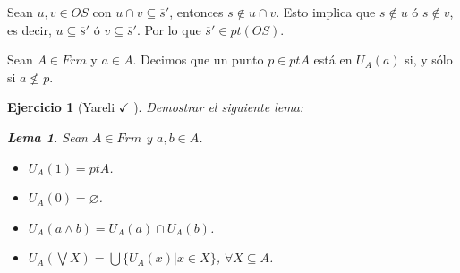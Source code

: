 \documentclass[12pt,letterpaper,titlepage]{article}
\let\emptyset\varnothing
\newtheorem{exe}{Ejercicio}
\newtheorem*{lemma}{Lema}
\theoremstyle{definition}
\newcommand\Sup{\bigvee}
\renewcommand\inf{\wedge}
\newcommand\<{\langle}
\renewcommand\>{\rangle}
\begin{document}
Sean $u,v\in OS$ con $u\cap v\subseteq \overline{s}'$, entonces $s\notin u\cap v$. Esto implica que $s\notin u$ ó $s\notin v$, es decir, $u\subseteq \overline{s}'$ ó $v\subseteq \overline{s}'$. Por lo que $\overline{s}'\in pt(OS)$.\par \vspace{5mm}
Sean $A\in Frm$ y $a\in A$. Decimos que un punto $p\in ptA$ está en $U_A(a)$ si, y sólo si $a\not\leq p$.
\begin{exe}[Yareli $\checkmark$ ]
Demostrar el siguiente lema:
  \begin{lemma}
    Sean $A\in Frm$ y $a,b\in A$.
    \begin{itemize}
        \item $U_A(1)=ptA$.
        \item $U_A(0)=\emptyset$.
        \item $U_A(a\inf b)=U_A(a)\cap U_A(b)$.
        \item $U_A(\Sup X)=\bigcup \{U_A(x)|x\in X\}$, $\forall X\subseteq A$.
    \end{itemize}
  \end{lemma}
\end{exe}
\end{document}
